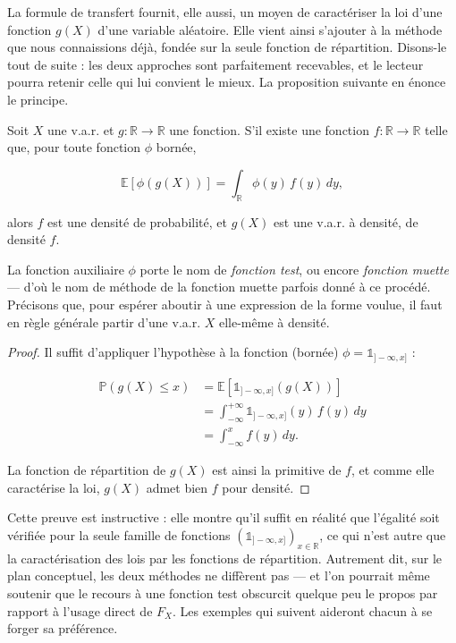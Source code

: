 La formule de transfert fournit, elle aussi, un moyen de caractériser la loi d'une fonction $g(X)$ d'une variable aléatoire. Elle vient ainsi s'ajouter à la méthode que nous connaissions déjà, fondée sur la seule fonction de répartition. Disons-le tout de suite : les deux approches sont parfaitement recevables, et le lecteur pourra retenir celle qui lui convient le mieux. La proposition suivante en énonce le principe.

\medskip

\begin{mdframed}
\begin{proposition}
Soit $X$ une v.a.r. et $g : \mathbb{R} \to \mathbb{R}$ une fonction. S'il existe une fonction $f : \mathbb{R} \to \mathbb{R}$ telle que, pour toute fonction $\phi$ bornée,

$$
\mathbb{E}[\phi(g(X))] = \int_{\mathbb{R}} \phi(y)\, f(y)\, dy,
$$

alors $f$ est une densité de probabilité, et $g(X)$ est une v.a.r. à densité, de densité $f$.
\end{proposition}
\end{mdframed}

La fonction auxiliaire $\phi$ porte le nom de \emph{fonction test}, ou encore \emph{fonction muette} — d'où le nom de méthode de la fonction muette parfois donné à ce procédé. Précisons que, pour espérer aboutir à une expression de la forme voulue, il faut en règle générale partir d'une v.a.r. $X$ elle-même à densité.

\begin{proof}
Il suffit d'appliquer l'hypothèse à la fonction (bornée) $\phi = \mathbb{1}_{]-\infty, x]}$ :

\begin{align*}
\mathbb{P}(g(X) \leq x) &= \mathbb{E}[\mathbb{1}_{]-\infty, x]}(g(X))] \\
&= \int_{-\infty}^{+\infty} \mathbb{1}_{]-\infty, x]}(y)\, f(y)\, dy \\
&= \int_{-\infty}^x f(y)\, dy.
\end{align*}

La fonction de répartition de $g(X)$ est ainsi la primitive de $f$, et comme elle caractérise la loi, $g(X)$ admet bien $f$ pour densité.
\end{proof}

Cette preuve est instructive : elle montre qu'il suffit en réalité que l'égalité soit vérifiée pour la seule famille de fonctions $(\mathbb{1}_{]-\infty, x]})_{x \in \mathbb{R}}$, ce qui n'est autre que la caractérisation des lois par les fonctions de répartition. Autrement dit, sur le plan conceptuel, les deux méthodes ne diffèrent pas — et l'on pourrait même soutenir que le recours à une fonction test obscurcit quelque peu le propos par rapport à l'usage direct de $F_X$. Les exemples qui suivent aideront chacun à se forger sa préférence.

